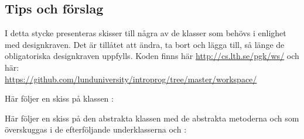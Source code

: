 \subsection{Tips och förslag}\label{lab:snake:tips}

I detta stycke presenteras skisser till några av de klasser som behövs i enlighet med designkraven. Det är tillåtet att ändra, ta bort och lägga till, så länge de obligatoriska designkraven uppfylls. Koden finns här \url{http://cs.lth.se/pgk/ws/} och här: \\
\url{https://github.com/lunduniversity/introprog/tree/master/workspace/}

%

Här följer en skiss på klassen :


Här följer en skiss på den abstrakta klassen  med de abstrakta metoderna  och  som överskuggas i de efterföljande underklasserna  och :
